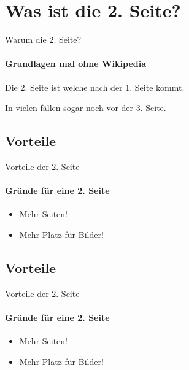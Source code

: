 \section{Was ist die 2. Seite?}

\begin{frame}{Warum die 2. Seite?}
\framesubtitle{Grundlagen mal ohne Wikipedia}
Die 2. Seite ist welche nach der 1. Seite kommt.

In vielen fällen sogar noch vor der 3. Seite.
\end{frame}


\subsection{Vorteile}

\begin{frame}{Vorteile der 2. Seite}
\framesubtitle{Gründe für eine 2. Seite}
\begin{itemize}
\item Mehr Seiten!
\item Mehr Platz für Bilder!
\end{itemize}
\end{frame}

\subsection{Vorteile}

\begin{frame}{Vorteile der 2. Seite}
\framesubtitle{Gründe für eine 2. Seite}
\begin{itemize}
\item Mehr Seiten!
\item Mehr Platz für Bilder!
\end{itemize}
\end{frame}

